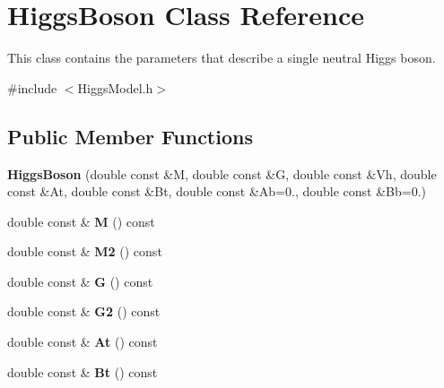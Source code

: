 \hypertarget{classHiggsBoson}{}\section{Higgs\+Boson Class Reference}
\label{classHiggsBoson}


This class contains the parameters that describe a single neutral Higgs boson.  




{\ttfamily \#include $<$Higgs\+Model.\+h$>$}

\subsection*{Public Member Functions}
\begin{DoxyCompactItemize}
\item 
\hypertarget{classHiggsBoson_aef7e66e7df2850281117c8065f86266a}{}{\bfseries Higgs\+Boson} (double const \&M, double const \&G, double const \&Vh, double const \&At, double const \&Bt, double const \&Ab=0., double const \&Bb=0.)\label{classHiggsBoson_aef7e66e7df2850281117c8065f86266a}

\item 
\hypertarget{classHiggsBoson_a3a18ef5458760d0b4fe6f7f67847f200}{}double const \& {\bfseries M} () const \label{classHiggsBoson_a3a18ef5458760d0b4fe6f7f67847f200}

\item 
\hypertarget{classHiggsBoson_a1cbc3cabab562910857fd24602c88029}{}double const \& {\bfseries M2} () const \label{classHiggsBoson_a1cbc3cabab562910857fd24602c88029}

\item 
\hypertarget{classHiggsBoson_abee4eef942de0a4088166fa59b09054e}{}double const \& {\bfseries G} () const \label{classHiggsBoson_abee4eef942de0a4088166fa59b09054e}

\item 
\hypertarget{classHiggsBoson_aee7be204e7532152c97f6115632c76ac}{}double const \& {\bfseries G2} () const \label{classHiggsBoson_aee7be204e7532152c97f6115632c76ac}

\item 
\hypertarget{classHiggsBoson_a56fe580ffe65572242ba5170c5f95126}{}double const \& {\bfseries At} () const \label{classHiggsBoson_a56fe580ffe65572242ba5170c5f95126}

\item 
\hypertarget{classHiggsBoson_a0919c5fc894bb010490229271e781bdd}{}double const \& {\bfseries Bt} () const \label{classHiggsBoson_a0919c5fc894bb010490229271e781bdd}


\end{DoxyCompactItemize}
